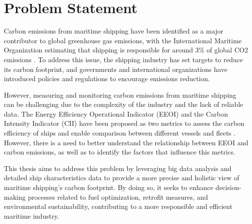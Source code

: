 \section{Problem Statement}

Carbon emissions from maritime shipping have been identified as a major contributor to global greenhouse gas emissions, with the International Maritime Organization estimating that shipping is responsible for around 3\% of global CO2 emissions \autocite{king_anthony_2022}.
To address this issue, the shipping industry has set targets to reduce its carbon footprint, and governments and international organizations have introduced policies and regulations to encourage emissions reduction.

However, measuring and monitoring carbon emissions from maritime shipping can be challenging due to the complexity of the industry and the lack of reliable data.
The Energy Efficiency Operational Indicator (EEOI) and the Carbon Intensity Indicator (CII) have been proposed as two metrics to assess the carbon efficiency of ships and enable comparison between different vessels and fleets \autocite{ZHANG2019118223,CHUAH2023115348}.
However, there is a need to better understand the relationship between EEOI and carbon emissions, as well as to identify the factors that influence this metrics.

This thesis aims to address this problem by leveraging big data analysis and detailed ship characteristics data to provide a more precise and holistic view of maritime shipping's carbon footprint. 
By doing so, it seeks to enhance decision-making processes related to fuel optimization, retrofit measures, and environmental sustainability, contributing to a more responsible and efficient maritime industry.